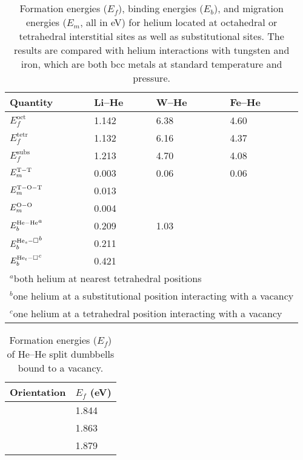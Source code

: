 \begin{table}
\caption[Formation energies ($E_f$), binding energies ($E_b$), and migration
  energies ($E_m$, all in eV)
  for helium located at octahedral or tetrahedral interstitial
  sites as well as substitutional sites]{Formation energies ($E_f$), binding energies ($E_b$), and migration
  energies ($E_m$, all in eV)
  for helium located at octahedral or tetrahedral interstitial
  sites as well as substitutional sites. The results are compared with helium
  interactions with tungsten and iron, which are both bcc metals at standard
  temperature and pressure.}
\label{tab:he_li} 
\centering
\renewcommand{\arraystretch}{1.45}
\begin{tabular}{l l l l} \toprule
Quantity & Li--He & W--He~\cite{Becquart2006}
    & Fe--He~\cite{seletskaia2005magnetic} \\ \midrule
$E_{f}^{\text{oct}}$        & 1.142 & 6.38 & 4.60 \\
$E_{f}^{\text{tetr}}$       & 1.132 & 6.16 & 4.37 \\
$E_f^{\text{subs}}$         & 1.213 & 4.70 & 4.08 \\
$E^{\ce{T-T}}_m$            & 0.003 & 0.06 & 0.06 \\
$E^{\ce{T-O-T}}_{m}$        & 0.013 & & \\
$E^{\ce{O-O}}_{m}$          & 0.004 & & \\
${E^{\ce{He}-\ce{He}}_b}^a$ & 0.209	& 1.03 & \\ 
${E_b^{\ce{He_s-\Box}}}^b$      & 0.211 \\
${E_b^{\ce{He_t-\Box}}}^c$      & 0.421 \\
	\bottomrule
\multicolumn{4}{p{9 cm}}{$^a$both helium at nearest tetrahedral positions} \\
\multicolumn{4}{p{9 cm}}{$^b$one helium at a substitutional position interacting with
    a vacancy} \\
\multicolumn{4}{p{9 cm}}{$^c$one helium at a tetrahedral position interacting with a
    vacancy} \\
\end{tabular}
\end{table}

\begin{table}
  \caption{Formation energies ($E_f$) of He--He split dumbbells bound to a
    vacancy.}
  \label{tab:hedmble}
  \centering
\renewcommand{\arraystretch}{1.2}
  \begin{tabular}{l l} \toprule
    Orientation & $E_f$ (eV) \\ \midrule
       & 1.844 \\
       & 1.863  \\
       & 1.879 \\ 
  \bottomrule
  \end{tabular}
\end{table}


